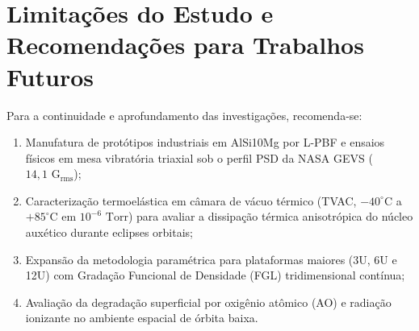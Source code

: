 \documentclass[12pt,a4paper]{report}
\begin{document}
\section{Limitações do Estudo e Recomendações para Trabalhos Futuros}
Para a continuidade e aprofundamento das investigações, recomenda-se:
\begin{enumerate}
    \item Manufatura de protótipos industriais em AlSi10Mg por L-PBF e ensaios físicos em mesa vibratória triaxial sob o perfil PSD da NASA GEVS ($14{,}1\text{ G}_{\text{rms}}$);
    \item Caracterização termoelástica em câmara de vácuo térmico (TVAC, $-40^\circ\text{C}$ a $+85^\circ\text{C}$ em $10^{-6}\text{ Torr}$) para avaliar a dissipação térmica anisotrópica do núcleo auxético durante eclipses orbitais;
    \item Expansão da metodologia paramétrica para plataformas maiores (3U, 6U e 12U) com Gradação Funcional de Densidade (FGL) tridimensional contínua;
    \item Avaliação da degradação superficial por oxigênio atômico (AO) e radiação ionizante no ambiente espacial de órbita baixa.
\end{enumerate}
\end{document}

